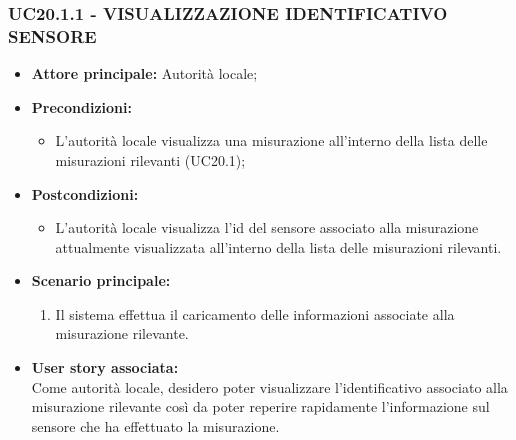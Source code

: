 \subsubsection{UC20.1.1 - VISUALIZZAZIONE IDENTIFICATIVO SENSORE}
\begin{itemize}
      \item \textbf{Attore principale:} Autorità locale;
      \item \textbf{Precondizioni:}
            \begin{itemize}
                  \item L'autorità locale visualizza una misurazione all'interno della lista delle misurazioni rilevanti (UC20.1);
            \end{itemize}
      \item \textbf{Postcondizioni:}
            \begin{itemize}
                \item L'autorità locale visualizza l'id del sensore associato alla misurazione attualmente visualizzata all'interno della lista delle misurazioni rilevanti.
            \end{itemize}
      \item \textbf{Scenario principale:}
            \begin{enumerate}
                \item Il sistema effettua il caricamento delle informazioni associate alla misurazione rilevante.
            \end{enumerate}
      \item \textbf{User story associata:} \\
      Come autorità locale, desidero poter visualizzare l'identificativo associato alla misurazione rilevante così da poter reperire rapidamente l'informazione sul sensore che ha effettuato la misurazione.
\end{itemize}